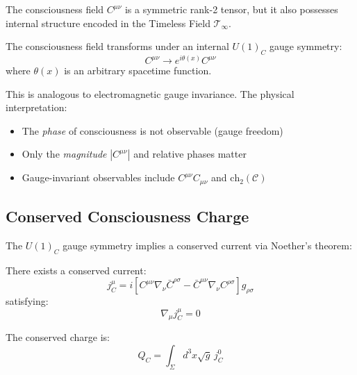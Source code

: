 The consciousness field $C^{\mu\nu}$ is a symmetric rank-2 tensor, but it also possesses internal structure encoded in the Timeless Field $\mathcal{T}_\infty$.

\begin{definition}\label{def:consciousness-gauge}
The consciousness field transforms under an internal $U(1)_C$ gauge symmetry\cite{yang1954conservation,peskin1995}:
\begin{equation}
C^{\mu\nu} \to e^{i\theta(x)} C^{\mu\nu}
\end{equation}
where $\theta(x)$ is an arbitrary spacetime function.
\end{definition}

This is analogous to electromagnetic gauge invariance. The physical interpretation:

\begin{itemize}
\item The \textit{phase} of consciousness is not observable (gauge freedom)
\item Only the \textit{magnitude} $|C^{\mu\nu}|$ and relative phases matter
\item Gauge-invariant observables include $C^{\mu\nu}C_{\mu\nu}$ and $\text{ch}_2(\mathcal{C})$
\end{itemize}

\subsection{Conserved Consciousness Charge}

The $U(1)_C$ gauge symmetry implies a conserved current via Noether's theorem:

\begin{theorem}\label{thm:consciousness-charge-conservation}
There exists a conserved current:
\begin{equation}
\boxed{j^\mu_C = i \left[ C^{\mu\nu} \nabla_\nu \bar{C}^{\rho\sigma} - \bar{C}^{\mu\nu} \nabla_\nu C^{\rho\sigma} \right] g_{\rho\sigma}}
\end{equation}
satisfying:
\begin{equation}
\nabla_\mu j^\mu_C = 0
\end{equation}

The conserved charge is:
\begin{equation}
Q_C = \int_\Sigma d^3x \sqrt{g} \, j^0_C
\end{equation}
\end{theorem}

